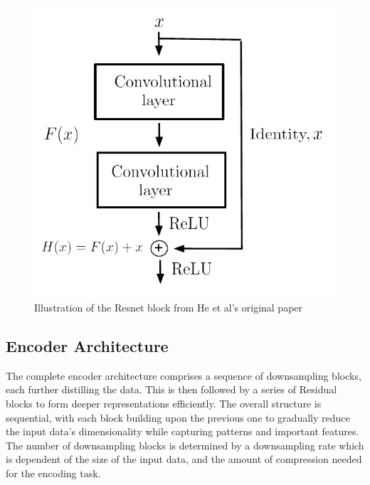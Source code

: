 \begin{figure}[H]
    \includegraphics[scale=0.6]{figures/figure-pdf/Resnet.pdf}
    \caption{Illustration of the Resnet block from He et al's original paper\cite{ResLearn} }
\end{figure}


\subsection{Encoder Architecture}
The complete encoder architecture comprises a sequence of downsampling blocks, each further distilling the data. This is then followed by a series of Residual blocks to form deeper representations efficiently. The overall structure is sequential, with each block building upon the previous one to gradually reduce the input data's dimensionality while capturing
patterns and important features. The number of downsampling blocks is determined by a downsampling rate which is dependent of the size of the input data, and the amount of compression needed for the encoding task.


